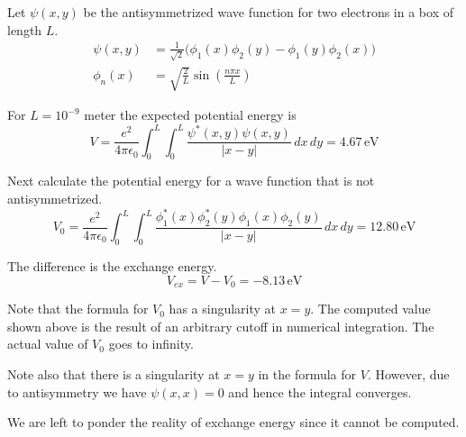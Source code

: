 \documentclass[12pt]{article}
\begin{document}
\noindent
Let $\psi(x,y)$ be the antisymmetrized wave function for two electrons in a box of length $L$.
\begin{align*}
\psi(x,y)&=\frac{1}{\sqrt{2}}
\big(\phi_1(x)\phi_2(y)-\phi_1(y)\phi_2(x)\big)
\\[2ex]
\phi_n(x)&=\sqrt{\frac{2}{L}}\sin\left(\frac{n\pi x}{L}\right)
\end{align*}

\noindent
For $L=10^{-9}$ meter the expected potential energy is
\begin{equation*}
V=\frac{e^2}{4\pi\epsilon_0}\int_0^L\int_0^L\frac{\psi^*(x,y)\psi(x,y)}{|x-y|}\,dx\,dy
=4.67\,\text{eV}
\end{equation*}

\noindent
Next calculate the potential energy for a wave function that is not antisymmetrized.
\begin{equation*}
V_0=\frac{e^2}{4\pi\epsilon_0}
\int_0^L\int_0^L\frac{\phi_1^*(x)\phi_2^*(y)\phi_1(x)\phi_2(y)}{|x-y|}\,dx\,dy
=12.80\,\text{eV}
\end{equation*}

\noindent
The difference is the exchange energy.
\begin{equation*}
V_{ex}=V-V_0=-8.13\,\text{eV}
\end{equation*}

\noindent
Note that the formula for $V_0$ has a singularity at $x=y$.
The computed value shown above is the result of an arbitrary cutoff in numerical integration.
The actual value of $V_0$ goes to infinity.

\bigskip
\noindent
Note also that there is a singularity at $x=y$ in the formula for $V$.
However, due to antisymmetry we have $\psi(x,x)=0$ and hence the integral converges.

\bigskip
\noindent
We are left to ponder the reality of exchange energy since it cannot be computed.
\end{document}
